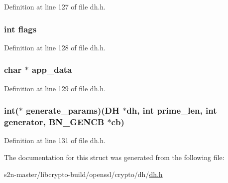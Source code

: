 Definition at line 127 of file dh.\+h.

\subsubsection[{\texorpdfstring{flags}{flags}}]{\setlength{\rightskip}{0pt plus 5cm}int flags}\hypertarget{structdh__method_ac8bf36fe0577cba66bccda3a6f7e80a4}{}\label{structdh__method_ac8bf36fe0577cba66bccda3a6f7e80a4}


Definition at line 128 of file dh.\+h.

\subsubsection[{\texorpdfstring{app\+\_\+data}{app_data}}]{\setlength{\rightskip}{0pt plus 5cm}char $\ast$ app\+\_\+data}\hypertarget{structdh__method_adc165d2dbd917509babcf4bcce182a13}{}\label{structdh__method_adc165d2dbd917509babcf4bcce182a13}


Definition at line 129 of file dh.\+h.

\subsubsection[{\texorpdfstring{generate\+\_\+params}{generate_params}}]{\setlength{\rightskip}{0pt plus 5cm}int($\ast$ generate\+\_\+params)({\bf DH} $\ast$dh, int prime\+\_\+len, int generator, {\bf B\+N\+\_\+\+G\+E\+N\+CB} $\ast${\bf cb})}\hypertarget{structdh__method_aee5f5e94b498bcedb84fccc3dd5e6e4b}{}\label{structdh__method_aee5f5e94b498bcedb84fccc3dd5e6e4b}


Definition at line 131 of file dh.\+h.



The documentation for this struct was generated from the following file\+:\begin{DoxyCompactItemize}
\item 
s2n-\/master/libcrypto-\/build/openssl/crypto/dh/\hyperlink{crypto_2dh_2dh_8h}{dh.\+h}\end{DoxyCompactItemize}
